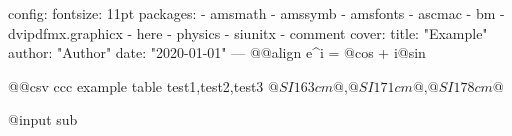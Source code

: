 config:
  fontsize: 11pt
  packages:
    - amsmath
    - amssymb
    - amsfonts
    - ascmac
    - bm
    - dvipdfmx.graphicx
    - here
    - physics
    - siunitx
    - comment
cover:
  title: "Example"
  author: "Author"
  date: "2020-01-01"
---
@@align
e^{i\pi} = @cos \pi@ + i@sin 

@@csv ccc
example table
test1,test2,test3
$@SI 163 cm@$,$@SI 171 cm@$,$@SI 178 cm@$

@input sub